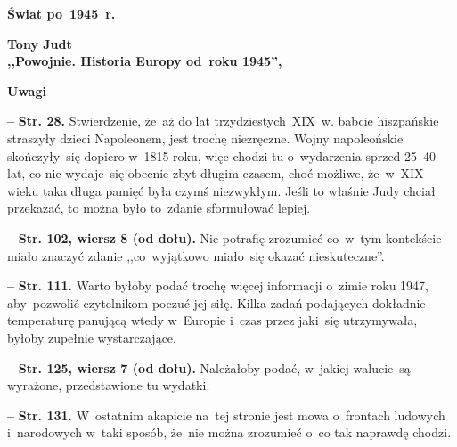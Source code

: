 \documentclass[a4paper,11pt]{article}
\newcommand{\spaceTwo}{2em}
\newcommand{\spaceThree}{1em}
\newcommand{\spaceFour}{0.5em}
\newcommand{\tb}{\textbf}
\newcommand{\noi}{\noindent}
\newcommand{\start}{\noi \tb{--} {}}
\newcommand{\Center}[1]{\begin{center} #1 \end{center}}
\newcommand{\CenterTB}[1]{\Center{\tb{#1}}}
\newcommand{\Str}[1]{\tb{Str. #1.}}
\newcommand{\StrWd}[2]{\tb{Str. #1, wiersz #2 (od dołu).}}
\newcommand{\Field}[1]{ \begin{center} {\LARGE \tb{#1} } \end{center} }
\newcommand{\Work}[1]{ \begin{center} {\large \tb{#1}} \end{center} }
\begin{document}
\vspace{\spaceTwo}





\newpage
\Field{Świat po~1945~r.}

\vspace{\spaceTwo} \vspace{\spaceThree}



\Work{
  Tony Judt \\
  ,,Powojnie. Historia Europy od~roku 1945'', \cite{JudtPowojnie16} }


\CenterTB{Uwagi}

\start \Str{28} Stwierdzenie, że~aż do lat trzydziestych~XIX~w. babcie
hiszpańskie straszyły dzieci Napoleonem, jest trochę niezręczne. Wojny
napoleońskie skończyły~się dopiero w~1815 roku, więc chodzi tu
o~wydarzenia sprzed 25--40 lat, co nie wydaje~się obecnie zbyt długim
czasem, choć możliwe, że~w~XIX wieku taka długa pamięć była czymś
niezwykłym. Jeśli to właśnie Judy chciał przekazać, to można było
to~zdanie sformułować lepiej.

\vspace{\spaceFour}


\start \StrWd{102}{8} Nie potrafię zrozumieć co~w~tym kontekście miało
znaczyć zdanie ,,co~wyjątkowo miało~się okazać nieskuteczne''.

\vspace{\spaceFour}


\start \Str{111} Warto byłoby podać trochę więcej informacji o~zimie
roku 1947, aby~pozwolić czytelnikom poczuć jej siłę. Kilka zadań
podających dokładnie temperaturę panującą wtedy w~Europie i~czas przez
jaki~się utrzymywała, byłoby zupełnie wystarczające.

\vspace{\spaceFour}


\start \StrWd{125}{7} Należałoby podać, w~jakiej walucie~są wyrażone,
przedstawione tu wydatki.

\vspace{\spaceFour}


\start \Str{131} W~ostatnim akapicie na~tej stronie jest mowa
o~frontach ludowych i~narodowych w~taki sposób, że~nie można zrozumieć
o~co tak naprawdę chodzi.

\vspace{\spaceFour}
\end{document}
